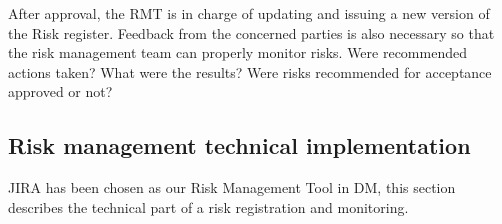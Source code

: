 After approval, the RMT is in charge of updating and issuing a new version of the Risk register. Feedback from the concerned parties is also necessary so that the risk management team can properly monitor risks. Were recommended actions taken? What were the results? Were risks recommended for acceptance approved or not?

\subsection{Risk management technical implementation \label{sect:technical} }
JIRA has been chosen as our Risk Management Tool in DM, this section describes the technical part of a risk registration and monitoring.
